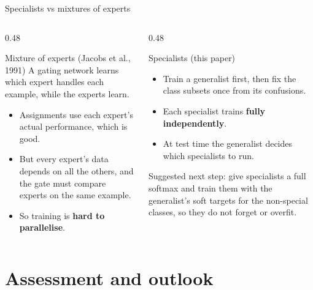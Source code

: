 \documentclass[aspectratio=169,11pt]{beamer}
\begin{document}
\begin{frame}{Specialists vs mixtures of experts}
  \begin{columns}[T]
    \begin{column}{0.48\textwidth}
      \begin{block}{Mixture of experts (Jacobs et al., 1991)}
        \small
        A gating network learns which expert handles each example, while the experts learn.
        \begin{itemize}
          \item Assignments use each expert's actual performance, which is good.
          \item But every expert's data depends on all the others, and the gate must compare experts on the same example.
          \item So training is \textbf{hard to parallelise}.
        \end{itemize}
      \end{block}
    \end{column}
    \begin{column}{0.48\textwidth}
      \begin{exampleblock}{Specialists (this paper)}
        \small
        \begin{itemize}
          \item Train a generalist first, then fix the class subsets once from its confusions.
          \item Each specialist trains \textbf{fully independently}.
          \item At test time the generalist decides which specialists to run.
        \end{itemize}
        Suggested next step: give specialists a full softmax and train them with the generalist's soft targets for the non-special classes, so they do not forget or overfit.
      \end{exampleblock}
    \end{column}
  \end{columns}
\end{frame}

\section{Assessment and outlook}
\end{document}
